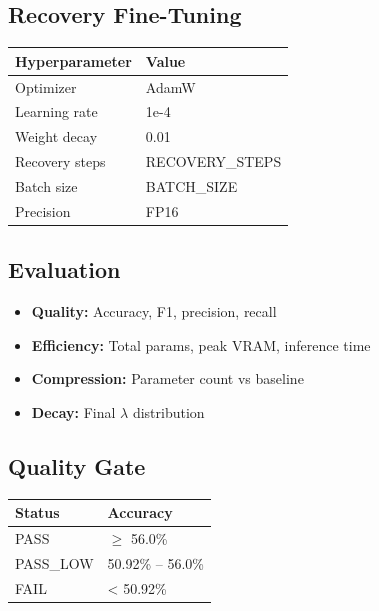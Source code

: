 \subsection{Recovery Fine-Tuning}

\begin{table}[H]
\centering
\small
\begin{tabular}{ll}
\toprule
\textbf{Hyperparameter} & \textbf{Value} \\
\midrule
Optimizer & AdamW \\
Learning rate & 1e-4 \\
Weight decay & 0.01 \\
Recovery steps & {{RECOVERY\_STEPS}} \\
Batch size & {{BATCH\_SIZE}} \\
Precision & FP16 \\
\bottomrule
\end{tabular}
\end{table}

\subsection{Evaluation}

\begin{itemize}
\item \textbf{Quality:} Accuracy, F1, precision, recall
\item \textbf{Efficiency:} Total params, peak VRAM, inference time
\item \textbf{Compression:} Parameter count vs baseline
\item \textbf{Decay:} Final $\lambda$ distribution

\end{itemize}
\subsection{Quality Gate}

\begin{table}[H]
\centering
\small
\begin{tabular}{ll}
\toprule
\textbf{Status} & \textbf{Accuracy} \\
\midrule
PASS & $\ge$ 56.0\% \\
PASS\_LOW & 50.92\% -- 56.0\% \\
FAIL & < 50.92\% \\
\bottomrule
\end{tabular}
\end{table}


